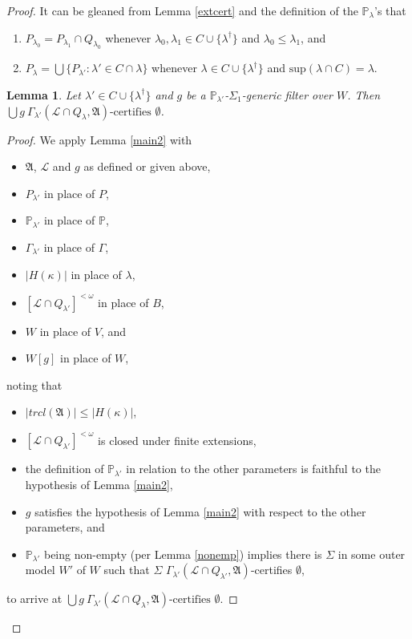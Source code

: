\documentclass[12pt, twoside]{memoir}
\numberwithin{equation}{section}
\newtheorem{lem}[thm]{Lemma}
\theoremstyle{definition}
\theoremstyle{remark}
\theoremstyle{definition}
\theoremstyle{definition}
\theoremstyle{definition}
\theoremstyle{remark}
\begin{document}
\begin{proof}
It can be gleaned from Lemma \ref{extcert} and the definition of the $\mathbb{P}_{\lambda}$'s that
\begin{enumerate}[label=(P\arabic*), leftmargin=40pt]
    \item\label{p1} $P_{\lambda_0} = P_{\lambda_1} \cap Q_{\lambda_0}$ whenever $\lambda_0, \lambda_1 \in C \cup \{\lambda^{\dagger}\}$ and $\lambda_0 \leq \lambda_1$, and
    \item\label{p2} $P_{\lambda} = \bigcup \{P_{\lambda'} : \lambda' \in C \cap \lambda\}$ whenever $\lambda \in C \cup \{\lambda^{\dagger}\}$ and $\mathrm{sup}(\lambda \cap C) = \lambda$.
\end{enumerate}

\begin{lem}\label{modeldone}
Let $\lambda' \in C \cup \{\lambda^{\dagger}\}$ and $g$ be a $\mathbb{P}_{\lambda'}$-$\Sigma_1$-generic filter over $W$. Then $\bigcup g \ \Gamma_{\lambda'} (\mathcal{L} \cap Q_{\lambda}, \mathfrak{A}) \text{-certifies } \emptyset$.
\end{lem}

\begin{proof}
We apply Lemma \ref{main2} with 
\begin{itemize}
    \item $\mathfrak{A}$, $\mathcal{L}$ and $g$ as defined or given above,
    \item $P_{\lambda'}$ in place of $P$,
    \item $\mathbb{P}_{\lambda'}$ in place of $\mathbb{P}$, 
    \item $\Gamma_{\lambda'}$ in place of $\Gamma$,
    \item $|H(\kappa)|$ in place of $\lambda$,
    \item $[\mathcal{L} \cap Q_{\lambda'}]^{< \omega}$ in place of $B$,
    \item $W$ in place of $V$, and
    \item $W[g]$ in place of $W$,
\end{itemize}
noting that
\begin{itemize}
    \item $|trcl(\mathfrak{A})| \leq |H(\kappa)|$,
    \item $[\mathcal{L} \cap Q_{\lambda'}]^{< \omega}$ is closed under finite extensions,
    \item the definition of $\mathbb{P}_{\lambda'}$ in relation to the other parameters is faithful to the hypothesis of Lemma \ref{main2},
    \item $g$ satisfies the hypothesis of Lemma \ref{main2} with respect to the other parameters, and
    \item $\mathbb{P}_{\lambda'}$ being non-empty (per Lemma \ref{nonemp}) implies there is $\Sigma$ in some outer model $W'$ of $W$ such that $\Sigma$ $\Gamma_{\lambda'} (\mathcal{L} \cap Q_{\lambda'}, \mathfrak{A})$-certifies $\emptyset$,
\end{itemize}
to arrive at $\bigcup g \ \Gamma_{\lambda'} (\mathcal{L} \cap Q_{\lambda}, \mathfrak{A}) \text{-certifies } \emptyset$.
\end{proof}


\end{proof}
\end{document}
